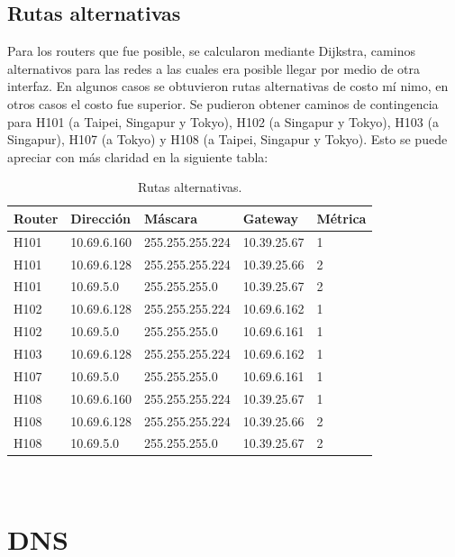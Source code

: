 \documentclass[12pt,titlepage]{article}
\begin{document}
\subsection{Rutas alternativas}

Para los routers que fue posible, se calcularon mediante Dijkstra, caminos alternativos para las redes a las cuales era posible llegar por medio de otra interfaz. En algunos casos se obtuvieron rutas alternativas de costo m\'i nimo, en otros casos el costo fue superior.
Se pudieron obtener caminos de contingencia para H101 (a Taipei, Singapur y Tokyo), H102 (a Singapur y Tokyo), H103 (a Singapur), H107 (a Tokyo) y H108 (a Taipei, Singapur y Tokyo).
Esto se puede apreciar con m\'as claridad en la siguiente tabla:

\begin{table}
  \begin{center}
    \begin{tabular}{|l|l|l|l|l|}
      \hline
         \bf{Router} & \bf{Direcci\'on} & \bf{M\'ascara} & \bf{Gateway} & \bf{M\'etrica} \\
      \hline 
	H101 & 10.69.6.160  & 255.255.255.224 & 10.39.25.67 & 1 \\
	H101 & 10.69.6.128  & 255.255.255.224 & 10.39.25.66 & 2 \\
            H101 & 10.69.5.0  & 255.255.255.0 & 10.39.25.67 & 2 \\
            H102 & 10.69.6.128  & 255.255.255.224 & 10.69.6.162 & 1 \\
            H102 & 10.69.5.0  & 255.255.255.0 & 10.69.6.161 & 1 \\
            H103 & 10.69.6.128  & 255.255.255.224 & 10.69.6.162 & 1 \\
            H107 & 10.69.5.0  & 255.255.255.0 & 10.69.6.161 & 1 \\
	H108 & 10.69.6.160  & 255.255.255.224 & 10.39.25.67 & 1 \\
	H108 & 10.69.6.128  & 255.255.255.224 & 10.39.25.66 & 2 \\
            H108 & 10.69.5.0  & 255.255.255.0 & 10.39.25.67 & 2 \\
    \hline
    \end{tabular} \\
  \end{center}
  \caption{Rutas alternativas.}
\end{table}


\section{DNS}
\end{document}
